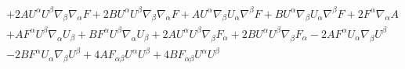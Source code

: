 \documentclass[10pt,letterpaper]{article}
\numberwithin{equation}{section}
\begin{document}
\begin{eqnarray}
&& + 2 A U^{\alpha } U^{\beta } \nabla_{\beta }\nabla_{\alpha }F + 2 B U^{\alpha } U^{\beta } \nabla_{\beta }\nabla_{\alpha }F + A U^{\alpha } \nabla_{\beta }U_{\alpha } \nabla^{\beta }F + B U^{\alpha } \nabla_{\beta }U_{\alpha } \nabla^{\beta }F+2 F^{\alpha } \nabla_{\alpha }A \nonumber \\ 
&& + A F^{\alpha } U^{\beta } \nabla_{\alpha }U_{\beta } + B F^{\alpha } U^{\beta } \nabla_{\alpha }U_{\beta } + 2 A U^{\alpha } U^{\beta } \nabla_{\beta }F_{\alpha } + 2 B U^{\alpha } U^{\beta } \nabla_{\beta }F_{\alpha } - 2 A F^{\alpha } U_{\alpha } \nabla_{\beta }U^{\beta } \nonumber \\ 
&& - 2 B F^{\alpha } U_{\alpha } \nabla_{\beta }U^{\beta }+4 A F_{\alpha \beta } U^{\alpha } U^{\beta } + 4 B F_{\alpha \beta } U^{\alpha } U^{\beta }
\end{eqnarray}
%
%
%
\newpage
\end{document}
